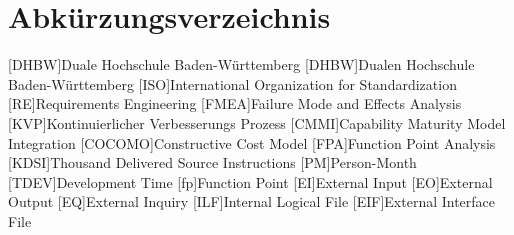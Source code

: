 \section*{Abkürzungsverzeichnis}
\begin{acronym}
  [DHBW]{Duale Hochschule Ba\-den-\-Würt\-tem\-berg}
  [DHBW]{Dualen Hochschule Ba\-den-\-Würt\-tem\-berg}
  [ISO]{International Organization for Standardization}
  [RE]{Requirements Engineering}
  [FMEA]{Failure Mode and Effects Analysis}
  [KVP]{Kontinuierlicher Verbesserungs Prozess}
  [CMMI]{Capability Maturity Model Integration}
  [COCOMO]{Constructive Cost Model}
  [FPA]{Function Point Analysis}
  [KDSI]{Thousand Delivered Source Instructions}
  [PM]{Person-Month}
  [TDEV]{Development Time}
  [fp]{Function Point}
  [EI]{External Input}
  [EO]{External Output}
  [EQ]{External Inquiry}
  [ILF]{Internal Logical File}
  [EIF]{External Interface File}
\end{acronym}
\newpage